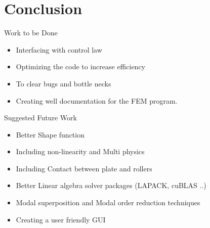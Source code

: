 \documentclass[9pt]{beamer}
\begin{document}
\section{Conclusion}



\begin{frame}
\begin{block}{Work to be Done}
\begin{itemize}
\item Interfacing with control law
\item Optimizing the code to increase efficiency
\item To clear bugs and bottle necks
\item Creating well documentation for the FEM program.
\end{itemize}
\end{block}




\begin{block}{Suggested Future Work}
\begin{itemize}
\item Better Shape function
\item Including non-linearity and Multi physics
\item Including Contact between plate and rollers
\item Better Linear algebra solver packages (LAPACK, cuBLAS ..)
\item Modal superposition and Modal order reduction  techniques
\item Creating a user friendly GUI
\end{itemize}
\end{block}

\end{frame}
\end{document}
